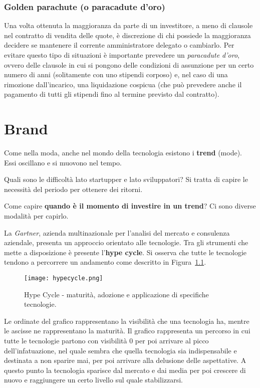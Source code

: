 \subsection{Golden parachute (o paracadute d'oro)}
Una volta ottenuta la maggioranza da parte di un investitore, a meno di
clausole nel contratto di vendita delle quote, è discrezione di chi possiede la
maggioranza decidere se mantenere il corrente amministratore delegato o
cambiarlo. Per evitare questo tipo di situazioni è importante prevedere un
\textit{paracadute d'oro}, ovvero delle clausole in cui si pongono delle
condizioni di assunzione per un certo numero di anni (solitamente con uno
stipendi corposo) e, nel caso di una rimozione dall'incarico, una liquidazione
cospicua (che può prevedere anche il pagamento di tutti gli stipendi fino al
termine previsto dal contratto).

\chapter{Brand}

Come nella moda, anche nel mondo della tecnologia esistono i \textbf{trend}
(mode). Essi oscillano e si muovono nel tempo.

Quali sono le difficoltà lato startupper e lato sviluppatori? Si tratta di
capire le necessità del periodo per ottenere dei ritorni.

Come capire \textbf{quando è il momento di investire in un trend}?
Ci sono diverse modalità per capirlo.

La \textit{Gartner}, azienda multinazionale per l'analisi del mercato e
consulenza aziendale, presenta un approccio orientato alle tecnologie. Tra gli
strumenti che mette a disposizione è presente l'\textbf{hype cycle}.
Si osserva che tutte le tecnologie tendono a percorrere un andamento come
descritto in Figura~\ref{fig:hypecycle}.

\begin{figure}[H]
\centering
\texttt{[image: hypecycle.png]}
\caption[Grafico Hype Cycle]{Hype Cycle - maturità, adozione e applicazione di
specifiche tecnologie.}
\label{fig:hypecycle}
\end{figure}

Le ordinate del grafico rappresentano la visibilità che una tecnologia ha,
mentre le ascisse ne rappresentano la maturità.
Il grafico rappresenta un percorso in cui tutte le tecnologie partono con
visibilità 0 per poi arrivare al picco dell'infatuazione, nel quale sembra che
quella tecnologia sia indispensabile e destinata a non sparire mai,
per poi arrivare alla delusione delle aspettative.
A questo punto la tecnologia sparisce dal mercato e dai media per poi crescere
di nuovo e raggiungere un certo livello sul quale stabilizzarsi.

